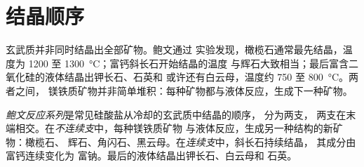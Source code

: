\section{结晶顺序}\label{sec:b2:magmatic-differentiation:sequences}

玄武质并非同时结晶出全部矿物。鲍文通过
实验发现，橄榄石通常最先结晶，温度为 1200 至
\qty{1300}{\celsius}；富钙斜长石开始结晶的温度
与辉石大致相当；最后富含二氧化硅的液体结晶出钾长石、石英和
或许还有白云母，温度约 750 至 \qty{800}{\celsius}。两者之间，
镁铁质矿物并非简单堆积：每种矿物都与液体反应，生成下一种矿物。

\begin{definition}[鲍文反应系列]\label{def:b2:magmatic-differentiation:bowen}
\emph{鲍文反应系列}是常见硅酸盐从冷却的玄武质中结晶的顺序，
分为两支，
两支在末端相交。在\emph{不连续支}中，每种镁铁质矿物
与液体反应，生成另一种结构的新矿物：橄榄石、
辉石、角闪石、黑云母。在\emph{连续支}中，斜长石持续结晶，
其成分由富钙连续变化为
富钠。最后的液体结晶出钾长石、白云母和
石英。
\end{definition}

